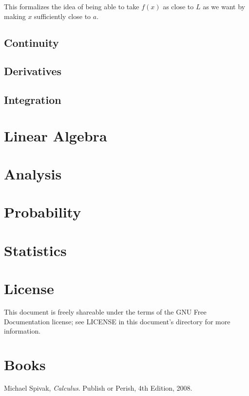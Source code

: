 \documentclass{article}
\begin{document}
This formalizes the idea of being able to take $f(x)$ as close to $L$ as we want
by making $x$ sufficiently close to $a$.

\subsection{Continuity}

\subsection{Derivatives}

\subsection{Integration}

\section{Linear Algebra}

\section{Analysis}

\section{Probability}

\section{Statistics}

\section{License}

This document is freely shareable under the terms of the GNU Free Documentation
license; see LICENSE in this document's directory for more information.

\section{Books}

\begin{thebibliography}{9}

  Michael Spivak,
  \emph{Calculus}.
  Publish or Perish,
  4th Edition,
  2008.

\end{thebibliography}
\end{document}

